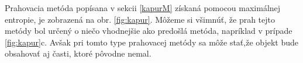 \documentclass[a4paper,12pt,twoside]{article}%
\begin{document}
Prahovacia metóda popísana v sekcii \ref{kapurM} získaná pomocou maximálnej entropie, je zobrazená na obr. \ref{fig:kapur}. Môžeme si všimnúť, že prah tejto metódy bol určený o niečo vhodnejšie ako predošlá metóda, napríklad v prípade \ref{fig:kapur}c. Avšak pri tomto type prahovacej metódy sa môže stať,že objekt bude obsahovať aj časti, ktoré pôvodne nemal.

\begin{figure}[H]  
    \hspace{5px}

\end{figure}
\end{document}
